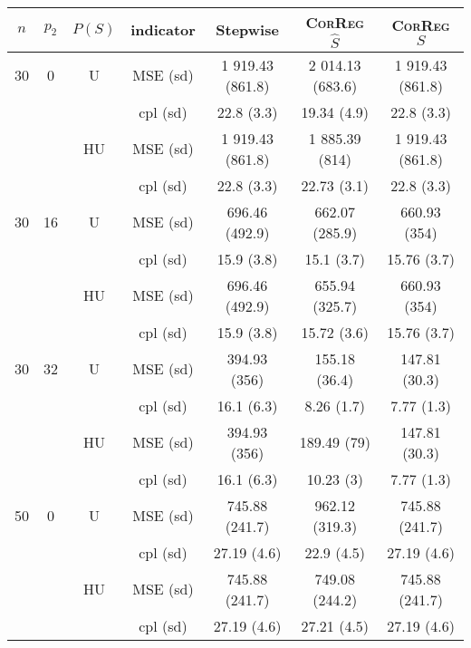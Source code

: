 \documentclass[11pt,a4paper]{article}
\begin{document}
\begin{table}[h!]
\centering
\begin{tabular}{|c|c|c|c|c|c|c|}
\hline 
$n$ & $p_2$&  $P(S)$ &indicator &Stepwise  &    \textsc{CorReg} $\hat S$& \textsc{CorReg} $S$\\ 
\hline %
30 & 0 & U& MSE (sd) & 1 919.43 (861.8) & 2 014.13 (683.6) & 1 919.43 (861.8) \\
& & &cpl (sd) & 22.8 (3.3) & 19.34 (4.9) & 22.8 (3.3) \\
 &  &HU &MSE (sd) & 1 919.43 (861.8) & 1 885.39 (814) & 1 919.43 (861.8) \\
& & & cpl (sd) & 22.8 (3.3) & 22.73 (3.1) & 22.8 (3.3) \\
\hline %
30 & 16 & U&MSE (sd) & 696.46 (492.9) & 662.07 (285.9) & 660.93 (354) \\
& & & cpl (sd) & 15.9 (3.8) & 15.1 (3.7) & 15.76 (3.7) \\
 &  &HU &MSE (sd) & 696.46 (492.9) & 655.94 (325.7) & 660.93 (354) \\
& & & cpl (sd) & 15.9 (3.8) & 15.72 (3.6) & 15.76 (3.7) \\
\hline %
30 & 32 & U & MSE (sd) & 394.93 (356) & 155.18 (36.4) & 147.81 (30.3) \\
& & &cpl (sd) & 16.1 (6.3) & 8.26 (1.7) & 7.77 (1.3) \\
 &  & HU &  MSE (sd) & 394.93 (356) & 189.49 (79) & 147.81 (30.3) \\
& & & cpl (sd) & 16.1 (6.3) & 10.23 (3) & 7.77 (1.3) \\
\hline
\hline %
50 & 0 & U&MSE (sd) & 745.88 (241.7) & 962.12 (319.3) & 745.88 (241.7) \\
& & & cpl (sd) & 27.19 (4.6) & 22.9 (4.5) & 27.19 (4.6) \\
 &  & HU &MSE (sd) & 745.88 (241.7) & 749.08 (244.2) & 745.88 (241.7) \\
& & & cpl (sd) & 27.19 (4.6) & 27.21 (4.5) & 27.19 (4.6) \\

\end{tabular}
\end{table}
\end{document}
